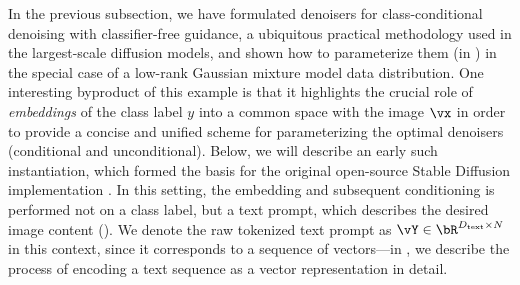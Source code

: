 \documentclass[../../book-main.tex]{subfiles}
\begin{document}
In the previous subsection, we have formulated denoisers for class-conditional
denoising with classifier-free guidance, a ubiquitous practical methodology used
in the largest-scale diffusion models, and shown how to parameterize them (in
) in the special case of a low-rank
Gaussian mixture model data distribution.
One interesting byproduct of this example is that it highlights the crucial role
of \textit{embeddings} of the class label $y$ into a common space with the image $\vx$ in
order to provide a concise and unified scheme for parameterizing the optimal
denoisers (conditional and unconditional).
Below, we will describe an early such instantiation, which
formed the basis for the original open-source Stable Diffusion implementation
\cite{rombach2022high}.
In this setting, the embedding and subsequent conditioning is performed not on
a class label, but a text prompt, which describes the desired image content
(). We denote the raw tokenized text prompt as $\vY \in
\bR^{D_{\mathrm{text}} \times N}$ in this context, since it corresponds to a sequence of
vectors---in , we describe the process of encoding a text
sequence as a vector representation in detail.
\end{document}
